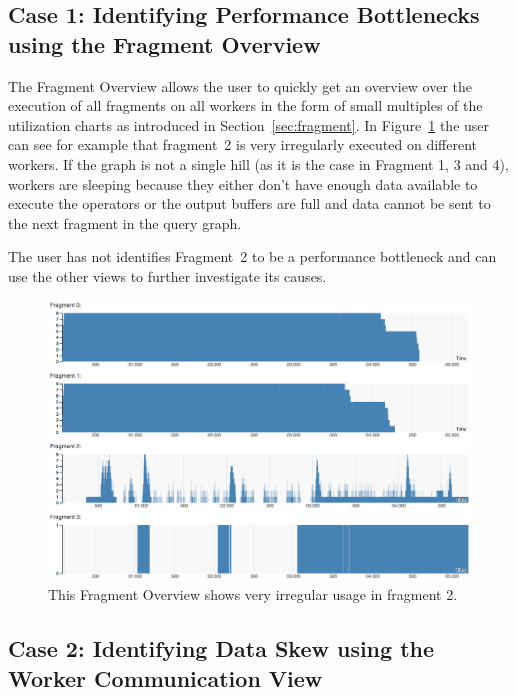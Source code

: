 \documentclass{chi2009}
\newcommand*{\network}{Worker Communication\xspace}
\newcommand*{\overall}{Fragment Overview\xspace}
\begin{document}


\subsection{Case 1: Identifying Performance Bottlenecks using the \overall}

The \overall allows the user to quickly get an overview over the execution of all fragments
on all workers in the form of small multiples of the utilization charts as introduced in
Section~\ref{sec:fragment}. In Figure~\ref{fig:overview_skew} the user can see for example
that fragment~2 is very irregularly executed on different workers. If the graph is not a
single hill (as it is the case in Fragment 1, 3 and 4), workers are sleeping because they
either don't have enough data available to execute the operators or the output buffers
are full and data cannot be sent to the next fragment in the query graph.

The user has not identifies Fragment~2 to be a performance bottleneck and can use the other views
to further investigate its causes.

\begin{figure}[ht]
  \includegraphics[width=\columnwidth]{images/overview_skew}
  \caption{This \overall shows very irregular usage in fragment 2.}
  \label{fig:overview_skew}
\end{figure}

\subsection{Case 2: Identifying Data Skew using the \network View}
\end{document}

